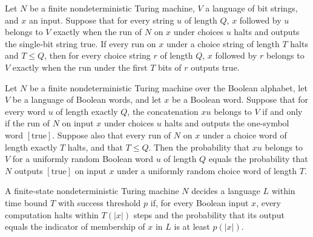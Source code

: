 \begin{theorem}
\label{Randomized.append_mem_iff_outputWith_take}
\leanok
{}
Let $N$ be a finite nondeterministic Turing machine, $V$ a language of bit strings, and
$x$ an input. Suppose that for every string $u$ of length $Q$, $x$ followed by $u$
belongs to $V$ exactly when the run of $N$ on $x$ under choices $u$ halts and outputs
the single-bit string true. If every run on $x$ under a choice string of length $T$
halts and $T\le Q$, then for every choice string $r$ of length $Q$, $x$ followed by $r$
belongs to $V$ exactly when the run under the first $T$ bits of $r$ outputs true.
\end{theorem}

\begin{theorem}
\label{Randomized.randProb_choiceVerifier}
\leanok
{}
Let $N$ be a finite nondeterministic Turing machine over the Boolean alphabet, let $V$
be a language of Boolean words, and let $x$ be a Boolean word. Suppose that for every
word $u$ of length exactly $Q$, the concatenation $xu$ belongs to $V$ if and only if the
run of $N$ on input $x$ under choices $u$ halts and outputs the one-symbol word
$[\mathrm{true}]$. Suppose also that every run of $N$ on $x$ under a choice word of
length exactly $T$ halts, and that $T\le Q$. Then the probability that $xu$ belongs to
$V$ for a uniformly random Boolean word $u$ of length $Q$ equals the probability that
$N$ outputs $[\mathrm{true}]$ on input $x$ under a uniformly random choice word of
length $T$.
\end{theorem}

\begin{definition}
\label{Turing.FinNDTM.BPDecidesInTimeWith}
\leanok
{}
A finite-state nondeterministic Turing machine $N$ decides a language $L$ within time
bound $T$ with success threshold $p$ if, for every Boolean input $x$, every computation
halts within $T(|x|)$ steps and the probability that its output equals the indicator of
membership of $x$ in $L$ is at least $p(|x|)$.
\end{definition}


